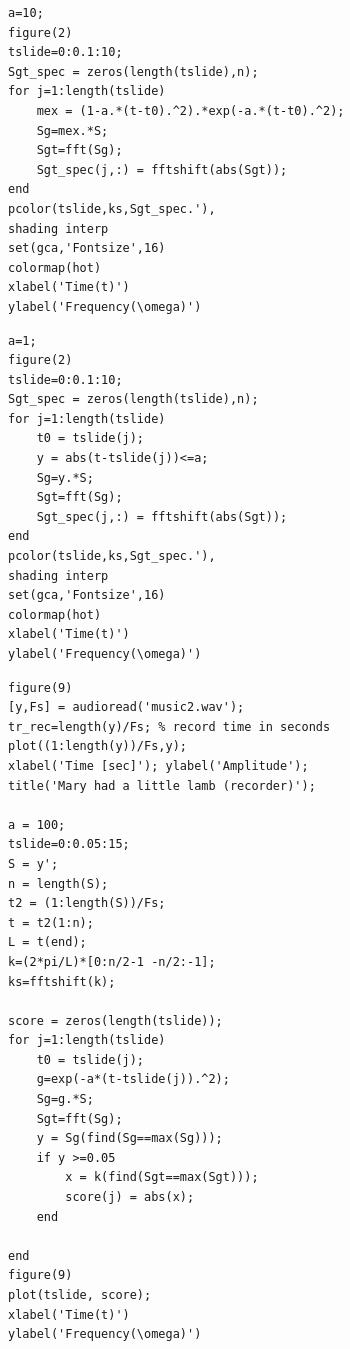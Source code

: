 \documentclass[12pt]{article}
\begin{document}
\begin{lstlisting}[caption={Generating Spectrogram of Mexican Hat Wavelet}, frame=single]
a=10;
figure(2)
tslide=0:0.1:10;
Sgt_spec = zeros(length(tslide),n);
for j=1:length(tslide)
    mex = (1-a.*(t-t0).^2).*exp(-a.*(t-t0).^2);
    Sg=mex.*S; 
    Sgt=fft(Sg); 
    Sgt_spec(j,:) = fftshift(abs(Sgt)); 
end
pcolor(tslide,ks,Sgt_spec.'), 
shading interp 
set(gca,'Fontsize',16) 
colormap(hot)
xlabel('Time(t)')
ylabel('Frequency(\omega)')
\end{lstlisting}

\begin{lstlisting}[caption={Generating Spectrogram of Shannon Window}, frame=single]
a=1;
figure(2)
tslide=0:0.1:10;
Sgt_spec = zeros(length(tslide),n);
for j=1:length(tslide)
    t0 = tslide(j);
    y = abs(t-tslide(j))<=a;
    Sg=y.*S; 
    Sgt=fft(Sg); 
    Sgt_spec(j,:) = fftshift(abs(Sgt)); 
end
pcolor(tslide,ks,Sgt_spec.'), 
shading interp 
set(gca,'Fontsize',16) 
colormap(hot)
xlabel('Time(t)')
ylabel('Frequency(\omega)')
\end{lstlisting}

\begin{lstlisting}[caption={Generating Frequency-Time graph of music piece}, frame=single]
figure(9)
[y,Fs] = audioread('music2.wav');
tr_rec=length(y)/Fs; % record time in seconds
plot((1:length(y))/Fs,y);
xlabel('Time [sec]'); ylabel('Amplitude');
title('Mary had a little lamb (recorder)');

a = 100;
tslide=0:0.05:15;
S = y';
n = length(S);
t2 = (1:length(S))/Fs;
t = t2(1:n); 
L = t(end);
k=(2*pi/L)*[0:n/2-1 -n/2:-1]; 
ks=fftshift(k);

score = zeros(length(tslide));
for j=1:length(tslide)
    t0 = tslide(j);
    g=exp(-a*(t-tslide(j)).^2);  
    Sg=g.*S; 
    Sgt=fft(Sg); 
    y = Sg(find(Sg==max(Sg)));
    if y >=0.05
        x = k(find(Sgt==max(Sgt)));
        score(j) = abs(x);
    end

end
figure(9)
plot(tslide, score);
xlabel('Time(t)')
ylabel('Frequency(\omega)')
\end{lstlisting}
\end{document}
